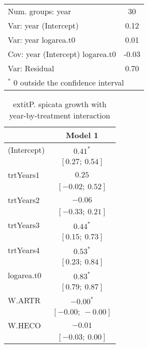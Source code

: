 \begin{table}
\begin{center}
\begin{tabular}{l c }
Num. groups: year                & 30                \\
Var: year (Intercept)            & 0.12              \\
Var: year logarea.t0             & 0.01              \\
Cov: year (Intercept) logarea.t0 & -0.03             \\
Var: Residual                    & 0.70              \\
\hline
\multicolumn{2}{l}{\scriptsize{$^*$ 0 outside the confidence interval}}
\end{tabular}
\label{table:PSSPgrowth-inARTR}
\end{center}
\end{table}


\begin{table}
\caption{	extit{P. spicata} growth with year-by-treatment interaction}
\begin{center}
\begin{tabular}{l c }
\hline
 & Model 1 \\
\hline
(Intercept)                      & $0.41^{*}$        \\
                                 & $[0.27;\ 0.54]$   \\
trtYears1                        & $0.25$            \\
                                 & $[-0.02;\ 0.52]$  \\
trtYears2                        & $-0.06$           \\
                                 & $[-0.33;\ 0.21]$  \\
trtYears3                        & $0.44^{*}$        \\
                                 & $[0.15;\ 0.73]$   \\
trtYears4                        & $0.53^{*}$        \\
                                 & $[0.23;\ 0.84]$   \\
logarea.t0                       & $0.83^{*}$        \\
                                 & $[0.79;\ 0.87]$   \\
W.ARTR                           & $-0.00^{*}$       \\
                                 & $[-0.00;\ -0.00]$ \\
W.HECO                           & $-0.01$           \\
                                 & $[-0.03;\ 0.00]$  \\

\end{tabular}
\end{center}
\end{table}
